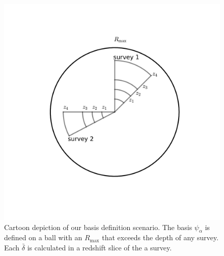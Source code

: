  \begin{figure}[!ht]
 \centering
\includegraphics[width=1\textwidth]{field.pdf}
  \caption{Cartoon depiction of our basis definition scenario. The basis $\psi_\alpha$ is defined on a ball with an $R_\text{max}$ that exceeds the depth of any survey. Each $\bar{\delta}$ is calculated in a redshift slice of the a survey. }
\label{fig:field}
\end{figure}


 
